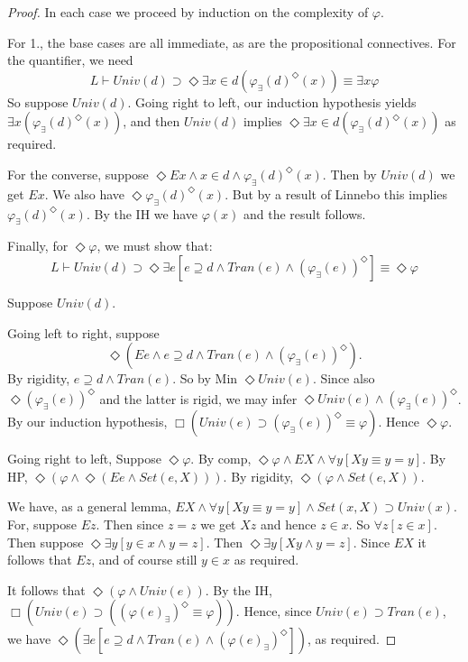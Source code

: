 \documentclass{article}
\begin{document}
\begin{proof}
    In each case we proceed by induction on the complexity of $\varphi$.

    For 1., the base cases are all immediate, as are the propositional connectives. 
    For the quantifier, we need 
    $$L \vdash Univ(d) \supset 
    \Diamond \exists x \in d(\varphi_\exists(d)^\Diamond(x)) 
    \equiv 
    \exists x \varphi$$
    So suppose $Univ(d)$. Going right to left, our induction hypothesis 
    yields \\ $\exists x (\varphi_\exists(d)^\Diamond(x))$, and then $Univ(d)$ 
    implies $\Diamond \exists x \in d (\varphi_\exists(d)^\Diamond(x))$ as 
    required. 

    For the converse, suppose 
    $\Diamond Ex \wedge x \in d \wedge \varphi_\exists(d)^\Diamond(x)$.
    Then by $Univ(d)$ we get $Ex$. We also have $\Diamond \varphi_\exists(d)^\Diamond(x)$.
    But by a result of Linnebo this implies $\varphi_\exists(d)^\Diamond(x)$.
    By the IH we have $\varphi(x)$ and the result follows.

    Finally, for $\Diamond \varphi$, we must show that:
    $$L \vdash Univ(d) \supset 
    \Diamond \exists e [e \supseteq d \wedge Tran(e) \wedge (\varphi_\exists(e))^\Diamond]
    \equiv 
    \Diamond \varphi$$

    Suppose $Univ(d)$. 
    
    Going left to right, suppose
    $$\Diamond (Ee \wedge e \supseteq d \wedge Tran(e) \wedge (\varphi_\exists(e))^\Diamond).$$
    By rigidity, $e \supseteq d \wedge Tran(e)$. So by Min $\Diamond Univ(e)$. Since also 
    $\Diamond (\varphi_\exists(e))^\Diamond$ and the latter is rigid, we may infer 
    $\Diamond Univ(e) \wedge (\varphi_\exists(e))^\Diamond$.
    By our induction hypothesis, 
    $\Box (Univ(e) \supset (\varphi_\exists(e))^\Diamond \equiv \varphi)$.
    Hence $\Diamond \varphi$. 
    
    Going right to left,
    Suppose $\Diamond \varphi$. By comp, 
    $\Diamond \varphi \wedge EX \wedge \forall y[Xy \equiv y = y]$.
    By HP, 
    $\Diamond (\varphi \wedge \Diamond (Ee \wedge Set(e, X)))$.
    By rigidity, $\Diamond (\varphi \wedge Set(e, X))$.

    We have, as a general lemma,
    $EX \wedge \forall y[Xy \equiv y = y] \wedge Set(x, X) \supset Univ(x)$.
    For, suppose $Ez$. Then since $z = z$ we get $Xz$ and hence $z \in x$. So 
    $\forall z[z \in x]$. Then suppose $\Diamond \exists y[y \in x \wedge y = z]$. 
    Then $\Diamond \exists y[Xy \wedge y = z]$. Since $EX$ it follows that $Ez$, 
    and of course still $y \in x$ as required.

    It follows that $\Diamond (\varphi \wedge Univ(e))$. By the IH, 
    $\Box (Univ(e) \supset ((\varphi(e)_\exists)^\Diamond \equiv \varphi))$. Hence,
    since $Univ(e) \supset Tran(e)$, we have 
    $\Diamond (\exists e[e  \supseteq d \wedge Tran(e) \wedge (\varphi(e)_\exists)^\Diamond])$,
    as required.

    

\end{proof}
\end{document}
